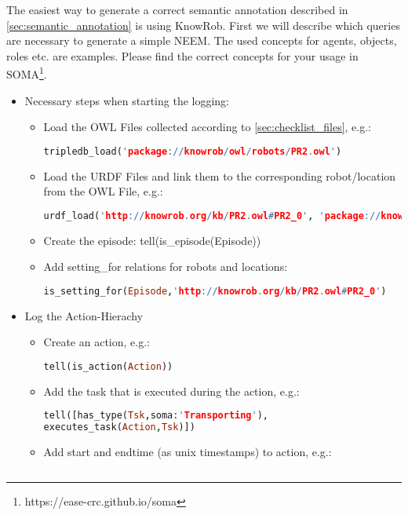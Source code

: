 The easiest way to generate a correct semantic annotation described in \ref{sec:semantic_annotation} is using KnowRob. First we will describe which queries are necessary to generate a simple NEEM. The used concepts for agents, objects, roles etc. are examples. Please find the correct concepts for your usage in SOMA\footnote{https://ease-crc.github.io/soma}.

\begin{itemize}
	\item Necessary steps when starting the logging:
	\begin{itemize}
		\item Load the OWL Files collected according to \ref{sec:checklist_files}, e.g.: 
			\begin{lstlisting}[language=Prolog]
tripledb_load('package://knowrob/owl/robots/PR2.owl')
			\end{lstlisting}
		\item Load the URDF Files and link them to the corresponding robot/location from the OWL File, e.g.:
		\begin{lstlisting}[language=Prolog]
urdf_load('http://knowrob.org/kb/PR2.owl#PR2_0', 'package://knowrob/urdf/pr2.urdf', [load_rdf])
		\end{lstlisting}
		\item Create the episode: tell(is\_episode(Episode))
		\item Add setting\_for relations for robots and locations: 
		\begin{lstlisting}[language=Prolog]
is_setting_for(Episode,'http://knowrob.org/kb/PR2.owl#PR2_0')
		\end{lstlisting}
	\end{itemize}
	\item Log the Action-Hierachy
	\begin{itemize}
		\item Create an action, e.g.:
			\begin{lstlisting}[language=Prolog]
tell(is_action(Action))
			\end{lstlisting}
		\item Add the task that is executed during the action, e.g.: 
			\begin{lstlisting}[language=Prolog]
tell([has_type(Tsk,soma:'Transporting'),
executes_task(Action,Tsk)])
			\end{lstlisting}
		\item Add start and endtime (as unix timestamps) to action, e.g.: 
			\begin{lstlisting}[language=Prolog]

\end{lstlisting}
\end{itemize}
\end{itemize}
